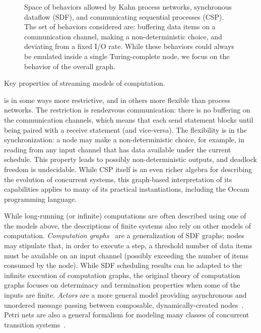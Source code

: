 \begin{figure}[t]
\centering{}
\caption[Space of behaviors allowable by different models of
  computation.]{Space of behaviors allowed by Kahn process networks,
  synchronous dataflow (SDF), and communicating sequential processes
  (CSP).  The set of behaviors considered are: buffering data items on
  a communication channel, making a non-deterministic choice, and
  deviating from a fixed I/O rate.  While these behaviors could always
  be emulated inside a single Turing-complete node, we focus on the
  behavior of the overall graph.
  \protect\label{fig:models-of-computation}}
\end{figure}

\begin{table}[t]
\centering{}
\caption{Key properties of streaming models of
  computation.\protect\label{tab:model-table}}
\end{table}

 is in some ways
  more restrictive, and in others more flexible than process networks.
  The restriction is rendezvous communication: there is no buffering
  on the communication channels, which means that each send statement
  blocks until being paired with a receive statement (and vice-versa).
  The flexibility is in the synchronization: a node may make a
  non-deterministic choice, for example, in reading from any input
  channel that has data available under the current schedule.  This
  property leads to possibly non-deterministic outputs, and deadlock
  freedom is undecidable.  While CSP itself is an even richer algebra
  for describing the evolution of concurrent systems, this graph-based
  interpretation of its capabilities applies to many of its practical
  instantiations, including the Occam programming language.

\myend

While long-running (or infinite) computations are often described
using one of the models above, the descriptions of finite systems also
rely on other models of computation.  {\it Computation
  graphs}~\cite{karp_properties_1966} are a generalization of SDF
graphs; nodes may stipulate that, in order to execute a step, a
threshold number of data items must be available on an input channel
(possibly exceeding the number of items consumed by the node).  While
SDF scheduling results can be adapted to the infinite execution of
computation graphs, the original theory of computation graphs focuses
on determinacy and termination properties when some of the inputs are
finite.  {\it Actors} are a more general model providing asynchronous
and unordered message passing between composable, dynamically-created
nodes~\cite{hewitt_universal_1973,greif_semantics_1975,clinger_foundations_1981,agha_actors:model_1985}.
Petri nets are also a general formalism for modeling many classes of
concurrent transition
systems~\cite{petri_communication_1962,murata_petri_1989}.

